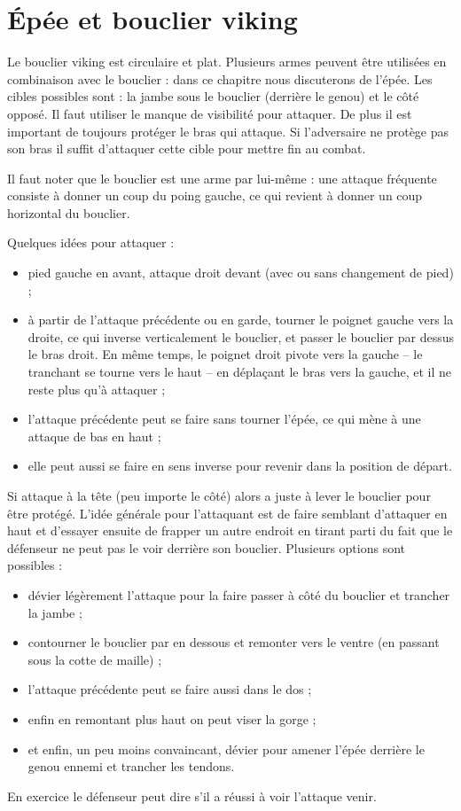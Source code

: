 \chapter{Épée et bouclier viking}


Le bouclier viking est circulaire et plat.
Plusieurs armes peuvent être utilisées en combinaison avec le bouclier : dans ce chapitre nous discuterons de l'épée.
Les cibles possibles sont : la jambe sous le bouclier (derrière le genou) et le côté opposé.
Il faut utiliser le manque de visibilité pour attaquer.
De plus il est important de toujours protéger le bras qui attaque.
Si l'adversaire ne protège pas son bras il suffit d'attaquer cette cible pour mettre fin au combat.

Il faut noter que le bouclier est une arme par lui-même : une attaque fréquente consiste à donner un coup du poing gauche, ce qui revient à donner un coup horizontal du bouclier.

\noindent
Quelques idées pour attaquer :
\begin{itemize}
	\item pied gauche en avant, attaque droit devant (avec ou sans changement de pied) ;
	\item à partir de l'attaque précédente ou en garde, tourner le poignet gauche vers la droite, ce qui inverse verticalement le bouclier, et passer le bouclier par dessus le bras droit.
	En même temps, le poignet droit pivote vers la gauche – le tranchant se tourne vers le haut – en déplaçant le bras vers la gauche, et il ne reste plus qu'à attaquer ;
	\item l'attaque précédente peut se faire sans tourner l'épée, ce qui mène à une attaque de bas en haut ;
	\item elle peut aussi se faire en sens inverse pour revenir dans la position de départ.
\end{itemize}

Si \A attaque \D à la tête (peu importe le côté) alors \D a juste à lever le bouclier pour être protégé.
L'idée générale pour l'attaquant est de faire semblant d'attaquer en haut et d'essayer ensuite de frapper un autre endroit en tirant parti du fait que le défenseur ne peut pas le voir derrière son bouclier.
Plusieurs options sont possibles :
\begin{itemize}
	\item dévier légèrement l'attaque pour la faire passer à côté du bouclier et trancher la jambe ;
	\item contourner le bouclier par en dessous et remonter vers le ventre (en passant sous la cotte de maille) ;
	\item l'attaque précédente peut se faire aussi dans le dos ;
	\item enfin en remontant plus haut on peut viser la gorge ;
	\item et enfin, un peu moins convaincant, dévier pour amener l'épée derrière le genou ennemi et trancher les tendons.
\end{itemize}
En exercice le défenseur peut dire s'il a réussi à voir l'attaque venir.


